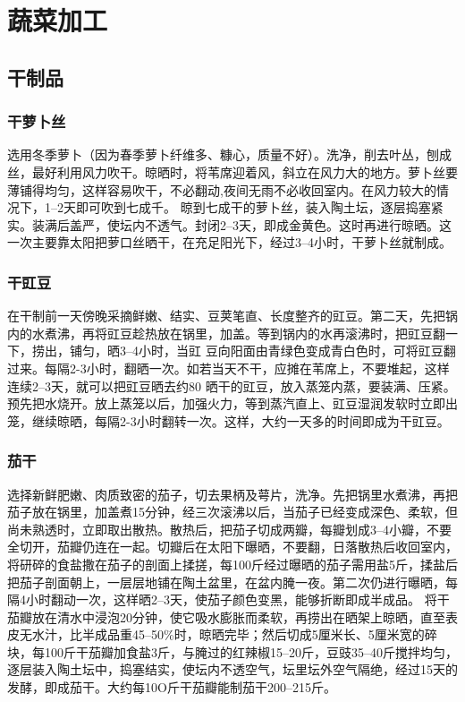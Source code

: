 \documentclass{ctexbook}
\begin{document}
\chapter{蔬菜加工}
\section{干制品}
\subsection{干萝卜丝}
选用冬季萝卜（因为春季萝卜纤维多、糠心，质量不好）。洗净，削去叶丛，刨成丝，最好利用风力吹干。晾晒时，将苇席迎着风，斜立在风力大的地方。萝卜丝要薄铺得均匀，这样容易吹干，不必翻动,夜间无雨不必收回室内。在风力较大的情况下，1--2天即可吹到七成千。
晾到七成干的萝卜丝，装入陶土坛，逐层捣塞紧实。装满后盖严，使坛内不透气。封闭2--3天，即成金黄色。这时再进行晾晒。这一次主要靠太阳把萝口丝晒干，在充足阳光下，经过3--4小时，干萝卜丝就制成。
\subsection{干豇豆}
在干制前一天傍晚采摘鲜嫩、结实、豆荚笔直、长度整齐的豇豆。第二天，先把锅内的水煮沸，再将豇豆趁热放在锅里，加盖。等到锅内的水再滚沸时，把豇豆翻一下，捞出，铺匀，晒3--4小时，当豇
豆向阳面由青绿色变成青白色时，可将豇豆翻过来。每隔2-3小时，翻晒一次。如若当天不干，应摊在苇席上，不要堆起，这样连续2--3天，就可以把豇豆晒去约80%
晒干的豇豆，放入蒸笼内蒸，要装满、压紧。预先把水烧开。放上蒸笼以后，加强火力，等到蒸汽直上、豇豆湿润发软时立即出笼，继续晾晒，每隔2-3小时翻转一次。这样，大约一天多的时间即成为干豇豆。
\subsection{茄干}
选择新鲜肥嫩、肉质致密的茄子，切去果柄及萼片，洗净。先把锅里水煮沸，再把茄子放在锅里，加盖煮15分钟，经三次滚沸以后，当茄子已经变成深色、柔软，但尚未熟透时，立即取出散热。散热后，把茄子切成两瓣，每瓣划成3--4小瓣，不要全切开，茄瓣仍连在一起。切瓣后在太阳下曝晒，不要翻，日落散热后收回室内，将研碎的食盐撒在茄子的剖面上揉搓，每100斤经过曝晒的茄子需用盐5斤，揉盐后把茄子剖面朝上，一层层地铺在陶土盆里，在盆内腌一夜。第二次仍进行曝晒，每隔4小时翻动一次，这样晒2--3天，使茄子颜色变黑，能够折断即成半成品。
将干茄瓣放在清水中浸泡20分钟，使它吸水膨胀而柔软，再捞出在晒架上晾晒，直至表皮无水汁，比半成品重45--50\%时，晾晒完毕；然后切成5厘米长、5厘米宽的碎块，每100斤干茄瓣加食盐3斤，与腌过的红辣椒15--20斤，豆豉35--40斤搅拌均匀，逐层装入陶土坛中，捣塞结实，使坛内不透空气，坛里坛外空气隔绝，经过15天的发酵，即成茄干。大约每10O斤干茄瓣能制茄干200--215斤。
\end{document}
